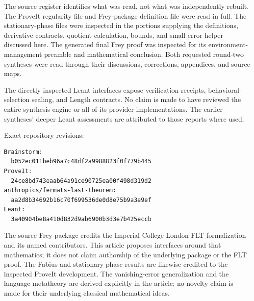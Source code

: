 \documentclass[11pt,a4paper]{article}
\theoremstyle{definition}
\theoremstyle{remark}
\begin{document}
The source register identifies what was read, not what was independently rebuilt. The ProveIt regularity file and Frey-package definition file were read in full. The stationary-phase files were inspected in the portions supplying the definitions, derivative contracts, quotient calculation, bounds, and small-error helper discussed here. The generated final Frey proof was inspected for its environment-management preamble and mathematical conclusion. Both requested round-two syntheses were read through their discussions, corrections, appendices, and source maps.

The directly inspected Leant interfaces expose verification receipts, behavioral-selection sealing, and Length contracts. No claim is made to have reviewed the entire synthesis engine or all of its provider implementations. The earlier syntheses' deeper Leant assessments are attributed to those reports where used.

Exact repository revisions:
\begin{lstlisting}
Brainstorm:
  b052ec011beb96a7c48df2a9988823f0f779b445
ProveIt:
  24ce8bd743eaab64a91ce90725ea00f498d319d2
anthropics/fermats-last-theorem:
  aa2d8b34692b16c70f699536de0d8e75b9a3e9ef
Leant:
  3a40904be8a410d832d9ab6900b3d3e7b425eccb
\end{lstlisting}

The source Frey package credits the Imperial College London FLT formalization and its named contributors. This article proposes interfaces around that mathematics; it does not claim authorship of the underlying package or the FLT proof. The Fabius and stationary-phase results are likewise credited to the inspected ProveIt development. The vanishing-error generalization and the language metatheory are derived explicitly in the article; no novelty claim is made for their underlying classical mathematical ideas.
\end{document}
